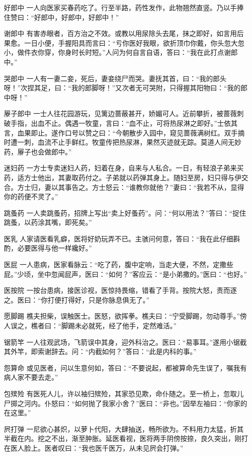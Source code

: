 \documentclass[12pt,UTF8]{ctexbook}
\begin{document}
好郎中
一人向医家买春药吃了。行至半路，药性发作，此物翘然直竖。乃以手捧住赞曰：“好郎中，好郎中，好郎中！”

谢郎中
有害赤眼者，百方治之不效。或教以用尿除头去尾，抹之即好，如言用后果愈。一日小便，手握阳具而言曰：“亏你医好我眼，欲折顶巾你戴，你头忽大忽小，做件衣你穿，你身时长时短。”人问为何自言自语，答曰：“我在此打点谢郎中。”

哭郎中
一人有一妻二妾，死后，妻妾绕尸而哭。妻抚其首，曰：“我的郎头呀！”次捏其足，曰：“我的郎脚呀！”又次者无可哭附，只得握其阳物曰：“我的郎中呀！”

屪子郎中
一士人往花园游玩，见篱边蔷蔽甚开，娇媚可人。近前攀折，被蔷薇刺破手指，出血不止。偶遇一牧童，言曰：“血不止，可将热尿淋之即好。”士依其言，血果即止。遂作口号以赞之曰：“今朝散步入园中，窥见蔷薇满树红。双手摘时遭一刺，血流不止手鲜红。牧童传把热尿淋，果然灭迹就无踪。莫道人间无妙药，屪子也会做郎中。”

迷妇药
一方士专卖迷妇人药，妇着在身，自来与人私合。一日，有轻浪子弟来买药，适方士他出，其妻取药付之。子弟就以药弹其身上。随妇至房，妇只得与伊交合。方士归，妻以其事告之。方士怒云：“谁教你就他？”妻曰：“我若不从，显得你的药便不灵了。”

跳蚤药
一人卖跳蚤药，招牌上写出“卖上好蚤药”。问：“何以用法？”答曰：“捉住跳蚤，以药涂其嘴，即死矣。”

医乳
人家请医看乳癖，医将好奶玩弄不已。主骇问何意，答曰：“我在此仔细斟酌，必要医得与他一样纔好。”

医屁
一人患病，医家看脉云：“吃了药，腹中定响，当走大便，不然，定撒些屁。”少顷，坐中忽闻屁声，医曰：“如何？”客应云：“是小弟撒的。”医曰：“也好。”

医按院
一按台患病，接医诊视，医惊持畏缩，错看了手背。按院大怒，责而逐之。医曰：“你打便打得好，只是你脉息俱无了。”

愿脚踢
樵夫担柴，误触医士。医怒，欲挥拳。樵夫曰：“宁受脚踢，勿动尊手。”傍人误之，樵者曰：“脚踢未必就死，经了他手，定然难活。”

锯箭竿
一人往观武场，飞箭误中其身，迎外科治之。医曰：“易事耳。”遂用小锯截其外竿，即索谢辞去。问：“内截如何？”答曰：“此是内科的事。”

怨算命
或见医者，问以生意何如，答曰：“不要说起，都被算命先生误了，嘱我有病人家不要去走。”

包殡殓
有医死人儿，许以袖归殡殓，其家恐见欺，命仆随之。至一桥上，忽取儿尸掷之河内。仆怒曰：“如何抛了我家小舍？”医曰：“非也。”因举左袖曰：“你家的在这里。”

屄打弹
一尼欲心甚炽，以萝卜代阳，大肆抽送，畅所欲为。不料用力太猛，折其半截在内。挖之不出，渐至肿胀。延医看视，医将两手阴傍按捺，良久突出，刚打在医人脸上。医者叹曰：“我也医千医万，从未见屄会打弹。”
\end{document}
